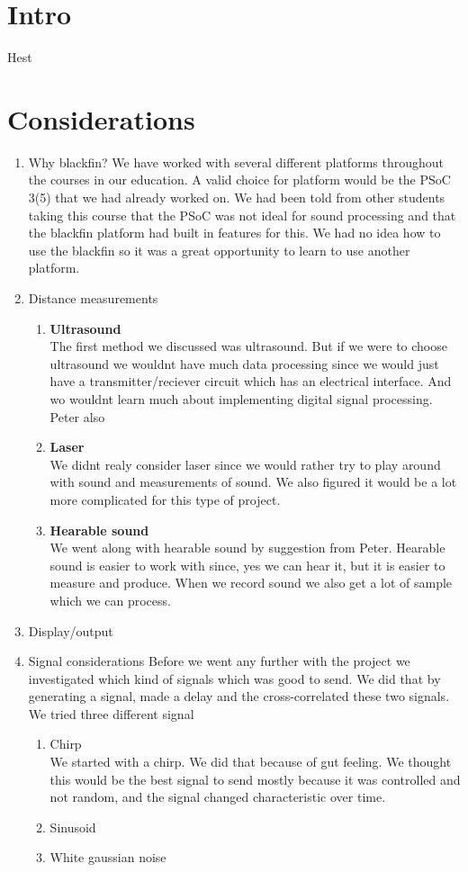 \chapter{Intro}
Hest

\chapter{Considerations}
\begin{enumerate}
\item Why blackfin?
We have worked with several different platforms throughout the courses in our education. A valid choice for platform would be the PSoC 3(5) that we had already worked on. We had been told from other students taking this course that the PSoC was not ideal for sound processing and that the blackfin platform had built in features for this. We had no idea how to use the blackfin so it was a great opportunity to learn to use another platform. 
\item Distance measurements
\begin{enumerate}

\item \textbf{Ultrasound}\\
The first method we discussed was ultrasound. But if we were to choose ultrasound we wouldnt have much data processing since we would just have a transmitter/reciever circuit which has an electrical interface. And wo wouldnt learn much about implementing digital signal processing. Peter also 

\item \textbf{Laser}\\
We didnt realy consider laser since we would rather try to play around with sound and measurements of sound. We also figured it would be a lot more complicated for this type of project.

\item \textbf{Hearable sound}\\
We went along with hearable sound by suggestion from Peter. Hearable sound is easier to work with since, yes we can hear it, but it is easier to measure and produce. When we record sound we also get a lot of sample which we can process.

\end{enumerate}

\item Display/output
\item Signal considerations
Before we went any further with the project we investigated which kind of signals which was good to send. We did that by generating a signal, made a delay and the cross-correlated these two signals.
We tried three different signal
\begin{enumerate}
\item Chirp\\
We started with a chirp. We did that because of gut feeling. We thought this would be the best signal to send mostly because it was controlled and not random, and the signal changed characteristic over time.
\item Sinusoid
\item White gaussian noise
\end{enumerate}


\end{enumerate}
